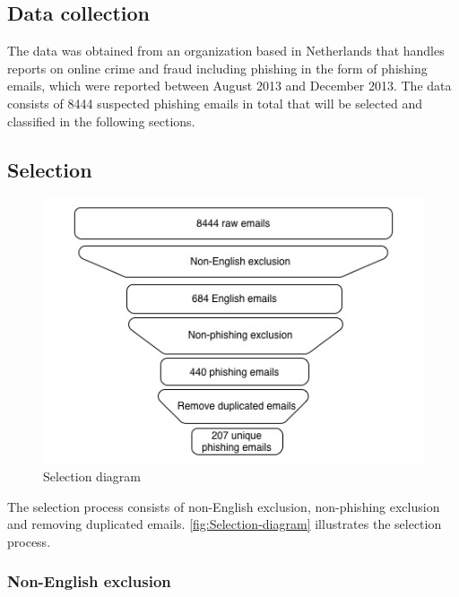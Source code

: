 \subsection{Data collection}

The data was obtained from an organization based in Netherlands that
handles reports on online crime and fraud including phishing in the
form of phishing emails, which were reported between August 2013 and
December 2013. The data consists of 8444 suspected phishing emails
in total that will be selected and classified in the following sections.


\subsection{\label{sub:Selection}Selection}

\begin{figure}[H]
%


%
\begin{centering}
\includegraphics[scale=0.7]{gfx/selection}\protect\caption{\label{fig:Selection-diagram}Selection diagram}

\par\end{centering}

%
%
\end{figure}


The selection process consists of non-English exclusion, non-phishing
exclusion and removing duplicated emails. \autoref{fig:Selection-diagram}
illustrates the selection process.


\subsubsection{Non-English exclusion}

